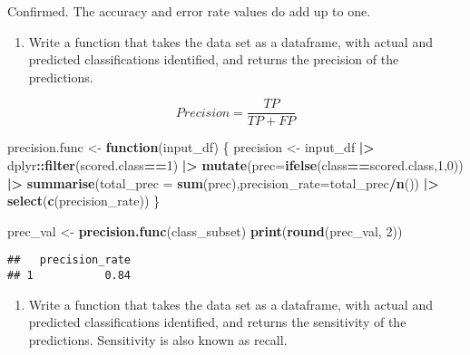 \documentclass[
]{article}
\newenvironment{Shaded}{\begin{snugshade}}{\end{snugshade}}
\newcommand{\AttributeTok}[1]{\textcolor[rgb]{0.13,0.29,0.53}{#1}}
\newcommand{\ControlFlowTok}[1]{\textcolor[rgb]{0.13,0.29,0.53}{\textbf{#1}}}
\newcommand{\DecValTok}[1]{\textcolor[rgb]{0.00,0.00,0.81}{#1}}
\newcommand{\FunctionTok}[1]{\textcolor[rgb]{0.13,0.29,0.53}{\textbf{#1}}}
\newcommand{\NormalTok}[1]{#1}
\newcommand{\OtherTok}[1]{\textcolor[rgb]{0.56,0.35,0.01}{#1}}
\newcommand{\SpecialCharTok}[1]{\textcolor[rgb]{0.81,0.36,0.00}{\textbf{#1}}}
\providecommand{\tightlist}{%
  \setlength{\itemsep}{0pt}\setlength{\parskip}{0pt}}
\begin{document}
Confirmed. The accuracy and error rate values do add up to one.

\begin{enumerate}
\def\labelenumi{\arabic{enumi}.}
\setcounter{enumi}{4}
\tightlist
\item
  Write a function that takes the data set as a dataframe, with actual
  and predicted classifications identified, and returns the precision of
  the predictions.
\end{enumerate}

\[Precision = \frac{TP}{TP + FP}\]

\begin{Shaded}
\begin{Highlighting}[]
\NormalTok{precision.func }\OtherTok{\textless{}{-}} \ControlFlowTok{function}\NormalTok{(input\_df) \{}
\NormalTok{    precision }\OtherTok{\textless{}{-}}\NormalTok{ input\_df }\SpecialCharTok{|\textgreater{}}\NormalTok{ dplyr}\SpecialCharTok{::}\FunctionTok{filter}\NormalTok{(scored.class}\SpecialCharTok{==}\DecValTok{1}\NormalTok{) }\SpecialCharTok{|\textgreater{}} \FunctionTok{mutate}\NormalTok{(}\AttributeTok{prec=}\FunctionTok{ifelse}\NormalTok{(class}\SpecialCharTok{==}\NormalTok{scored.class,}\DecValTok{1}\NormalTok{,}\DecValTok{0}\NormalTok{)) }\SpecialCharTok{|\textgreater{}} 
        \FunctionTok{summarise}\NormalTok{(}\AttributeTok{total\_prec =} \FunctionTok{sum}\NormalTok{(prec),}\AttributeTok{precision\_rate=}\NormalTok{total\_prec}\SpecialCharTok{/}\FunctionTok{n}\NormalTok{()) }\SpecialCharTok{|\textgreater{}} \FunctionTok{select}\NormalTok{(}\FunctionTok{c}\NormalTok{(precision\_rate))}
\NormalTok{\}}

\NormalTok{prec\_val }\OtherTok{\textless{}{-}} \FunctionTok{precision.func}\NormalTok{(class\_subset)}
\FunctionTok{print}\NormalTok{(}\FunctionTok{round}\NormalTok{(prec\_val, }\DecValTok{2}\NormalTok{))}
\end{Highlighting}
\end{Shaded}

\begin{verbatim}
##   precision_rate
## 1           0.84
\end{verbatim}

\begin{enumerate}
\def\labelenumi{\arabic{enumi}.}
\setcounter{enumi}{5}
\tightlist
\item
  Write a function that takes the data set as a dataframe, with actual
  and predicted classifications identified, and returns the sensitivity
  of the predictions. Sensitivity is also known as recall.
\end{enumerate}
\end{document}
